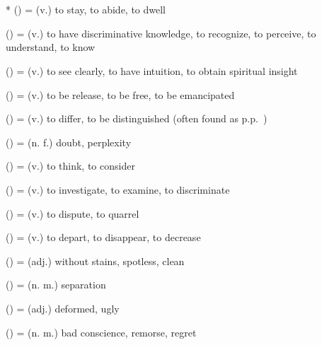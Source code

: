 \section*{}\label{upasagga:vi}
\begin{compactitem}
\item {}* () = (v.) to stay, to abide, to dwell
\item {} () = (v.) to have discriminative knowledge, to recognize, to perceive, to understand, to know
\item {} () = (v.) to see clearly, to have intuition, to obtain spiritual insight
\item {} () = (v.) to be release, to be free, to be emancipated
\item {} () = (v.) to differ, to be distinguished (often found as p.p.\ )
\item {} () = (n. f.) doubt, perplexity
\item {} () = (v.) to think, to consider
\item {} () = (v.) to investigate, to examine, to discriminate
\item {} () = (v.) to dispute, to quarrel
\item {} () = (v.) to depart, to disappear, to decrease
\item {} () = (adj.) without stains, spotless, clean
\item {} () = (n. m.) separation
\item {} () = (adj.) deformed, ugly
\item {} () = (n. m.) bad conscience, remorse, regret 
\end{compactitem}

